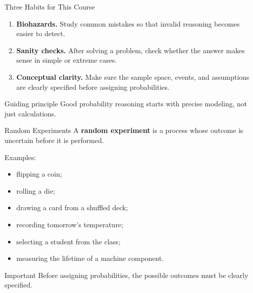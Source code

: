 \begin{frame}{Three Habits for This Course}
\begin{enumerate}
    \item \textbf{Biohazards.}  
    Study common mistakes so that invalid reasoning becomes easier to detect.

    \item \textbf{Sanity checks.}  
    After solving a problem, check whether the answer makes sense in simple or extreme cases.

    \item \textbf{Conceptual clarity.}  
    Make sure the sample space, events, and assumptions are clearly specified before assigning probabilities.
\end{enumerate}

\vspace{0.3cm}

\begin{keybox}{Guiding principle}
Good probability reasoning starts with precise modeling, not just calculations.
\end{keybox}
\end{frame}


\begin{frame}{Random Experiments}
A \textbf{random experiment} is a process whose outcome is uncertain before it is performed.

\vspace{0.3cm}

Examples:
\begin{itemize}
    \item flipping a coin;
    \item rolling a die;
    \item drawing a card from a shuffled deck;
    \item recording tomorrow's temperature;
    \item selecting a student from the class;
    \item measuring the lifetime of a machine component.
\end{itemize}

\vspace{0.25cm}

\begin{keybox}{Important}
Before assigning probabilities, the possible outcomes must be clearly specified.
\end{keybox}
\end{frame}

